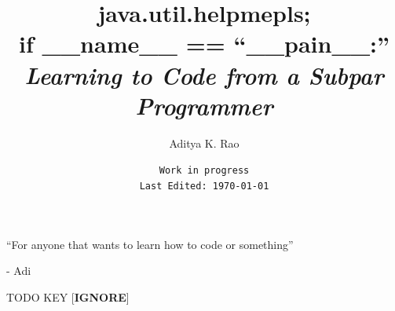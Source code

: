 \documentclass[12pt,a4paper]{book}
\newenvironment{dedication}
{%
	\thispagestyle{empty}%
	\vspace*{\stretch{1}}%
	\itshape             %
	\raggedleft          %
}
{\par %
	\vspace{\stretch{3}} %
	\clearpage           %
}
\begin{document}
	\title{java.util.helpmepls; \\
	if \_\_name\_\_ == ``\_\_pain\_\_:'' \\
	\large{\textit{Learning to Code from a Subpar Programmer}}}
	\author{Aditya K. Rao}
	\date{\texttt{Work in progress \\ Last Edited: \today}}
	\maketitle

	\begin{dedication}
		``For anyone that wants to learn how to code or something''
		\par   %
		
		\vspace{\baselineskip}
		- Adi
	\end{dedication}
	
	\tableofcontents
	\listoftodos
	TODO KEY [\textbf{IGNORE}]

	
\end{document}

